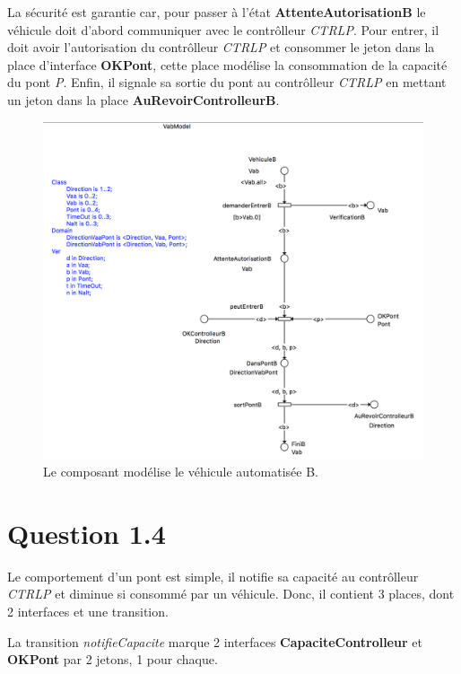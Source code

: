 \documentclass[a4paper,11pt]{report}
\begin{document}
	La sécurité est garantie car, pour passer à l'état \textbf{AttenteAutorisationB} le véhicule doit d'abord communiquer avec le contrôlleur \textit{CTRLP}. Pour entrer, il doit avoir l'autorisation du contrôlleur \textit{CTRLP} et consommer le jeton dans la place d'interface \textbf{OKPont},  cette place modélise la consommation de la capacité du pont \textit{P}. Enfin, il signale sa sortie du pont au contrôlleur \textit{CTRLP} en mettant un jeton dans la place \textbf{AuRevoirControlleurB}.

		\begin{figure}[!htbp]
		\centering
		\includegraphics[width = 15cm]{vabModel.png}
		\caption{Le composant modélise le véhicule automatisée B.}
	\end{figure}
	\newpage
	
	
\section{Question 1.4}
	Le comportement d'un pont est simple, il notifie  sa capacité au contrôlleur \textit{CTRLP} et diminue si consommé par un véhicule. Donc, il contient 3 places, dont 2 interfaces et une transition.
	
	La transition \textit{notifieCapacite} marque 2 interfaces \textbf{CapaciteControlleur} et \textbf{OKPont} par 2 jetons, 1 pour chaque.
\end{document}

